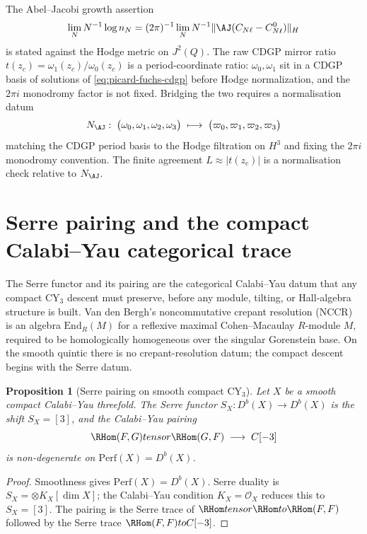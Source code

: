 \documentclass[12pt]{amsart}
\newtheorem{prop}[thm]{Proposition}
\theoremstyle{remark}
\providecommand{\Perf}{\mathrm{Perf}}
\providecommand{\End}{\mathrm{End}}
\providecommand{\cO}{\mathcal{O}}
\providecommand{\NAJ}{N_{\AJ}}
\begin{document}
The Abel--Jacobi growth assertion
\[
  \lim_N N^{-1}\log n_N
  =(2\pi)^{-1}\lim_N N^{-1}\|\AJ(C_{N\ell}-C_{N\ell}^0)\|_H
\]
is stated against
the Hodge metric on \(J^2(Q)\).  The raw CDGP mirror ratio
\(t(z_c)=\omega_1(z_c)/\omega_0(z_c)\) is a period-coordinate ratio:
\(\omega_0,\omega_1\) sit in a CDGP basis of solutions of
\eqref{eq:picard-fuchs-cdgp} before Hodge normalization, and
the \(2\pi i\) monodromy factor is not fixed.  Bridging the two requires
a normalisation datum
\[
  \NAJ\colon\;\bigl(\omega_0,\omega_1,\omega_2,\omega_3\bigr)
  \;\longmapsto\;\bigl(\varpi_0,\varpi_1,\varpi_2,\varpi_3\bigr)
\]
matching the CDGP period basis to the Hodge filtration on \(H^3\) and
		fixing the \(2\pi i\) monodromy convention.  The finite agreement
		\(L\approx|t(z_c)|\) is a normalisation check relative to \(\NAJ\).

\section{Serre pairing and the compact Calabi--Yau categorical trace}\label{sec:serre-nccr}

The Serre functor and its pairing are the categorical Calabi--Yau
datum that any compact CY\(_3\) descent must preserve, before any
module, tilting, or Hall-algebra structure is built.  Van den Bergh's
noncommutative crepant resolution (NCCR) is an algebra
\(\End_R(M)\) for a reflexive maximal Cohen--Macaulay \(R\)-module
\(M\), required to be homologically homogeneous over the singular
Gorenstein base.  On the smooth quintic there is no crepant-resolution
datum; the compact descent begins with the Serre datum.

\begin{prop}[Serre pairing on smooth compact CY$_3$]
  \label{prop:serre-nccr-substitute}
  Let \(X\) be a smooth compact Calabi--Yau threefold.  The Serre functor
  \(S_X\colon D^b(X)\to D^b(X)\) is the shift \(S_X=[3]\), and the
  Calabi--Yau pairing
  \[
    \RHom(F,G)\otimes\RHom(G,F)\;\longrightarrow\;\C[-3]
  \]
  is non-degenerate on \(\Perf(X)=D^b(X)\).
\end{prop}

\begin{proof}
  Smoothness gives \(\Perf(X)=D^b(X)\).  Serre duality is
  \(S_X=\otimes K_X[\dim X]\); the Calabi--Yau condition \(K_X=\cO_X\)
  reduces this to \(S_X=[3]\).  The pairing is the Serre trace of
  \(\RHom\otimes\RHom\to\RHom(F,F)\) followed by the Serre trace
  \(\RHom(F,F)\to\C[-3]\).
\end{proof}
\end{document}
